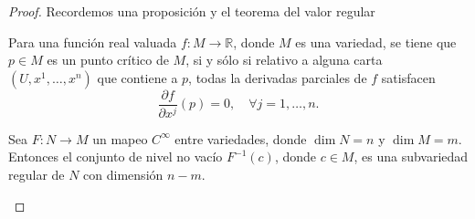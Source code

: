 \documentclass[12pt]{report}
\theoremstyle{largebreak}
\newcommand\cf[3]{\ensuremath{#1:#2\rightarrow#3}}
\begin{document}
    \begin{proof}
        Recordemos una proposición y el teorema del valor regular

        \setcounter{section}{8}
        \setcounter{propo}{22}

        \begin{propo}
            Para una función real valuada $\cf{f}{M}{\mathbb{R}}$, donde $M$ es una variedad, se tiene que $p\in M$ es un punto crítico de $M$, si y sólo si relativo a alguna carta $(U,x^1,\dots,x^n)$ que contiene a $p$, todas la derivadas parciales de $f$ satisfacen
            \begin{equation*}
                \frac{\partial f}{\partial x^j}(p)=0,\quad\forall j=1,\dots,n.
            \end{equation*}
        \end{propo}

        \setcounter{section}{9}
        \setcounter{theor}{8}

        \begin{theor}
            Sea $\cf{F}{N}{M}$ un mapeo $C^\infty$ entre variedades, donde $\dim N = n$ y $\dim M = m$. Entonces el conjunto de nivel no vacío $F^{-1}(c)$, donde $c\in M$, es una subvariedad regular de $N$ con dimensión $n-m$.
        \end{theor}


\end{proof}
\end{document}
